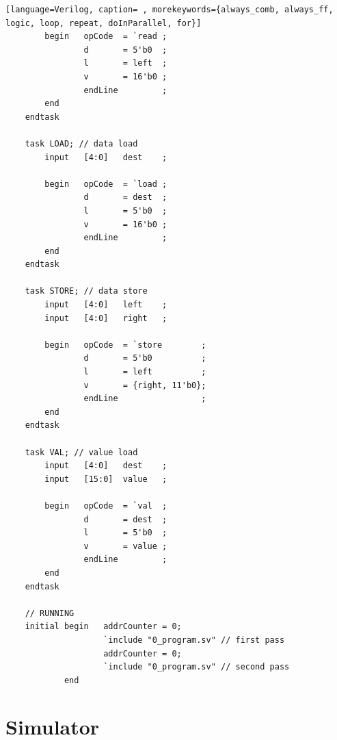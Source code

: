 {\begin{shaded*}
\begin{lstlisting}[language=Verilog, caption= , morekeywords={always_comb, always_ff, logic, loop, repeat, doInParallel, for}]
        begin   opCode  = `read ;
                d       = 5'b0  ;
                l       = left  ;
                v       = 16'b0 ;
                endLine         ;
        end
    endtask

    task LOAD; // data load
        input   [4:0]   dest    ;

        begin   opCode  = `load ;
                d       = dest  ;
                l       = 5'b0  ;
                v       = 16'b0 ;
                endLine         ;
        end
    endtask

    task STORE; // data store
        input   [4:0]   left    ;
        input   [4:0]   right   ;

        begin   opCode  = `store        ;
                d       = 5'b0          ;
                l       = left          ;
                v       = {right, 11'b0};
                endLine                 ;
        end
    endtask

    task VAL; // value load
        input   [4:0]   dest    ;
        input   [15:0]  value   ;

        begin   opCode  = `val  ;
                d       = dest  ;
                l       = 5'b0  ;
                v       = value ;
                endLine         ;
        end
    endtask

    // RUNNING
    initial begin   addrCounter = 0;
                    `include "0_program.sv" // first pass
                    addrCounter = 0;
                    `include "0_program.sv" // second pass
            end
\end{lstlisting}
\end{shaded*}
}

\section{Simulator}

